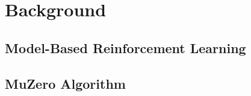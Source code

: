 \section{Background}


\subsection{Model-Based Reinforcement Learning}
\subsection{MuZero Algorithm}
